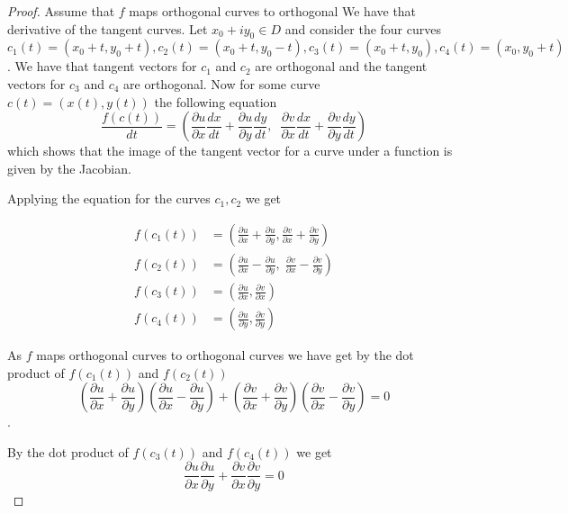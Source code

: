 \documentclass[letter,12pt,reqno]{article}
\begin{document}
    \begin{proof}
        Assume that $f$ maps orthogonal curves to orthogonal We have that derivative of the tangent curves. Let $x_0+iy_0\in D$ and consider the four curves $c_1(t)=(x_0+t,y_0+t), c_2(t)=(x_0+t,y_0-t), c_3(t)=(x_0+t,y_0) ,c_4(t)=(x_0,y_0+t)$. We have that tangent vectors for $c_1$ and $c_2$ are orthogonal and the tangent vectors for $c_3$ and $c_4$ are orthogonal. Now for some curve $c(t)=(x(t),y(t))$ the following equation  $$\frac{ f( c(t))}{dt}=(\frac{\partial u}{\partial x}\frac{dx}{dt}+\frac{\partial u}{\partial y}\frac{dy}{dt},\;\;\frac{\partial v}{\partial x}\frac{dx}{dt}+\frac{\partial v}{\partial y}\frac{dy}{dt})$$
        which shows that the image of the tangent vector for a curve under a function is given by the Jacobian.

        Applying the equation for the curves $c_1,c_2$ we get 

        \begin{align*}
            f(c_1(t)) &= (\frac{\partial u}{\partial x}+\frac{\partial u}{\partial y}, \frac{\partial v}{\partial x}+\frac{\partial v}{\partial y}) \\
            f(c_2(t)) &= (\frac{\partial u}{\partial x}-\frac{\partial u}{\partial y}, \; \frac{\partial v}{\partial x}-\frac{\partial v}{\partial y} )
            \\
            f(c_3(t)) & = (\frac{\partial u}{\partial x},\frac{\partial v}{\partial x})
            \\
            f(c_4(t)) & = (\frac{\partial u}{\partial y},\frac{\partial v}{\partial y})
        \end{align*}

        As $f$ maps orthogonal curves to orthogonal curves we have get by the dot product of $f(c_1(t))$ and $f(c_2(t))$
        \begin{equation}(\frac{\partial u}{\partial x}+\frac{\partial u}{\partial y})(\frac{\partial u}{\partial x}-\frac{\partial u}{\partial y})+(\frac{\partial v}{\partial x}+\frac{\partial v}{\partial y})(\frac{\partial v}{\partial x}-\frac{\partial v}{\partial y})=0\end{equation}.

        By the dot product of $f(c_3(t))$ and $f(c_4(t))$ we get \begin{equation}
            \frac{\partial u}{\partial x}\frac{\partial u}{\partial y}+\frac{\partial v}{\partial x}\frac{\partial v}{\partial y}=0
        \end{equation}
        

\end{proof}
\end{document}
